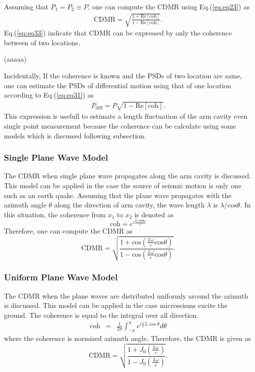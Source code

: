 \documentclass[a4paper,12pt]{book}
\begin{document}
Assuming that $P_{1}=P_{2} \equiv P$, one can compute the CDMR using Eq.(\ref{eq:eq23}) as
\begin{eqnarray}
 \mathrm{CDMR} = \sqrt{\frac{1 + \mathrm{Re} \left[\mathrm{coh} \right] }{1 - \mathrm{Re} \left[\mathrm{coh} \right]}}. \label{eq:eq33}
\end{eqnarray}
Eq.(\ref{eq:eq33}) indicate that CDMR can be expressed by only the coherence between of two locations.

(aaaaa)

Incidentally, If the coherence is known and the PSDs of two location are same, one can estimate the PSDs of differential motion using that of one location according to Eq.(\ref{eq:eq31}) as
\begin{eqnarray}
  P_\mathrm{diff} = P \sqrt{1 - \mathrm{Re[coh]}}. \label{eq:eq34}
\end{eqnarray}
This expression is usefull to estimate a length fluctuation of the arm cavity even single point measurement because the coherence can be calculate using some models which is discussed following subsection.

\subsubsection{Single Plane Wave Model}
The CDMR when single plane wave propagates along the arm cavity is discussed. This model can be applied in the case the source of seismic motion is only one such as an earth quake. Assuming that the plane wave propagates with the azimuth angle $\theta$ along the direction of arm cavity, the wave length $\lambda$ is $\lambda/\mathrm{cos}\theta$. In this situation, the coherence from $x_1$ to $x_2$ is denoted as
\begin{equation}
  \mathrm{coh}=e^{i\frac{L\mathrm{cos}\theta\omega}{c}}
\end{equation}
Therefore, one can compute the CDMR as
\begin{equation}  \label{eq:eq18}
  \mathrm{CDMR} = \sqrt{\frac{1+\mathrm{cos}(\frac{L\omega}{c}\mathrm{cos}\theta)}{1-\mathrm{cos}(\frac{L\omega}{c}\mathrm{cos}\theta)}}.
\end{equation}


\subsubsection{Uniform Plane Wave Model}
The CDMR when the plane waves are distributed uniformly around the azimuth is discussed. This model can be applied in the case microseisms excite the ground. The coherence is equal to the integral over all direction.
\begin{eqnarray} \label{eq:eq19}
  \mathrm{coh} &=& \frac{1}{2\pi} \int_{-\pi}^{\pi} e^{i\frac{\omega}{c} L\cos \theta} d \theta
\end{eqnarray}
where the coherence is normized azimuth angle. Therefore, the CDMR is given as
\begin{equation}  \label{eq:eq20}
  \mathrm{CDMR} = \sqrt{\frac{1+J_0(\frac{L\omega}{c})}{1-J_0(\frac{L\omega}{c})}} .
\end{equation}
\end{document}
